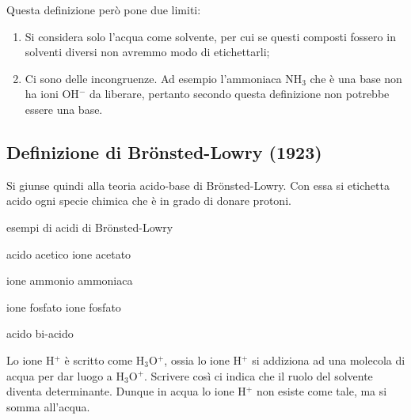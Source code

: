 \vspace{0.2cm}

\vspace{0.2cm}

\vspace{0.2cm}Questa definizione però pone due limiti:

\begin{enumerate}
    \item Si considera solo l'acqua come solvente, per cui se questi composti fossero in solventi diversi non avremmo modo di etichettarli;
    \item Ci sono delle incongruenze. Ad esempio l'ammoniaca NH$_3$ che è una base non ha ioni OH$^-$ da liberare, pertanto secondo questa definizione non potrebbe essere una base.
\end{enumerate}
\subsection{Definizione di Brönsted-Lowry (1923)}
Si giunse quindi alla teoria acido-base di Brönsted-Lowry. Con essa si etichetta acido ogni specie chimica che è in grado di donare protoni.

\vspace{0.2cm}esempi di acidi di Brönsted-Lowry

\vspace{0.2cm}

acido acetico \hspace{2.55cm} ione acetato 

\vspace{0.2cm}

ione ammonio \hspace{1.35cm} ammoniaca

\vspace{0.2cm}

ione fosfato \hspace{2.25cm} ione fosfato

acido \hspace{3.4cm} bi-acido

\vspace{0.2cm}Lo ione H$^+$ è scritto come H$_3$O$^+$, ossia lo ione H$^+$ si addiziona ad una molecola di acqua per dar luogo a H$_3$O$^+$. Scrivere così ci indica che il ruolo del solvente diventa determinante. Dunque in acqua lo ione H$^+$ non esiste come tale, ma si somma all'acqua.

